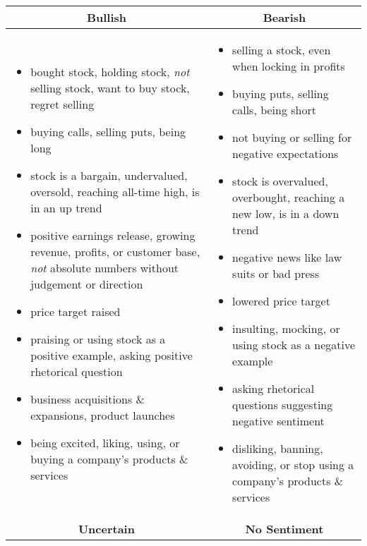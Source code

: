 
\begin{table}[!ht]
\centering
\small
\begin{tabular}{p{7.5cm}p{7.5cm}}
\toprule
\multicolumn{1}{c}{\textbf{Bullish}} & \multicolumn{1}{c}{\textbf{Bearish}} \\
\midrule

\begin{itemize}[noitemsep,leftmargin=*,topsep=-12pt]
	\item bought stock, holding stock, \emph{not} selling stock, want to buy stock, regret selling
	\item buying calls, selling puts, being long
	\item stock is a bargain, undervalued, oversold, reaching all-time high, is in an up trend
	\item positive earnings release, growing revenue, profits, or customer base, \emph{not} absolute numbers without judgement or direction
	\item price target raised
	\item praising or using stock as a positive example, asking positive rhetorical question
	\item business acquisitions \& expansions, product launches
	\item being excited, liking, using, or buying a company's products \& services

\end{itemize} & \begin{itemize}[noitemsep,leftmargin=*,topsep=-12pt]
	\item selling a stock, even when locking in profits
	\item buying puts, selling calls, being short
	\item not buying or selling for negative expectations
 	\item stock is overvalued, overbought, reaching a new low, is in a down trend
 	\item negative news like law suits or bad press
 	\item lowered price target
 	\item insulting, mocking, or using stock as a negative example
 	\item asking rhetorical questions suggesting negative sentiment 
	\item disliking, banning, avoiding, or stop using a company's products \& services

\end{itemize}\\
\toprule
\multicolumn{1}{c}{\textbf{Uncertain}} & \multicolumn{1}{c}{\textbf{No Sentiment}} \\
\midrule


\end{tabular}
\end{table}
